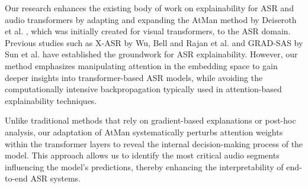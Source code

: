 \documentclass[../report.tex]{subfiles}
\begin{document}
    Our research enhances the existing body of work on explainability for ASR and audio transformers by adapting and expanding the AtMan method by Deiseroth et al. \cite{NEURIPS2023_c83bc020}, which was initially created for visual transformers, to the ASR domain. Previous studies such as X-ASR by Wu, Bell and Rajan et al. \cite{10094635} and GRAD-SAS by Sun et al. \cite{10143311} have established the groundwork for ASR explainability. However, our method emphasizes manipulating attention in the embedding space to gain deeper insights into transformer-based ASR models, while avoiding the computationally intensive backpropagation typically used in attention-based explainability techniques.

    Unlike traditional methods that rely on gradient-based explanations or post-hoc analysis, our adaptation of AtMan systematically perturbs attention weights within the transformer layers to reveal the internal decision-making process of the model. This approach allows us to identify the most critical audio segments influencing the model's predictions, thereby enhancing the interpretability of end-to-end ASR systems.
\end{document}
